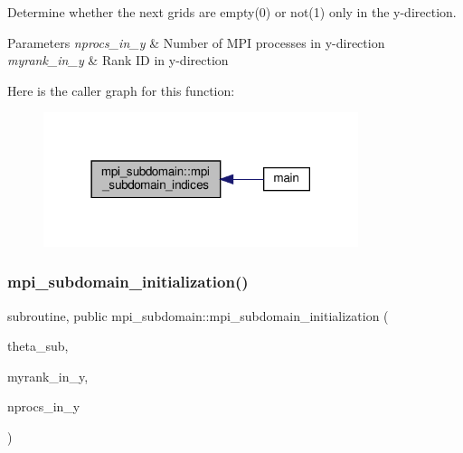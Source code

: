 Determine whether the next grids are empty(0) or not(1) only in the y-\/direction. 


\begin{DoxyParams}{Parameters}
{\em nprocs\+\_\+in\+\_\+y} & Number of M\+PI processes in y-\/direction \\
\hline
{\em myrank\+\_\+in\+\_\+y} & Rank ID in y-\/direction \\
\hline
\end{DoxyParams}
Here is the caller graph for this function\+:
\nopagebreak
\begin{figure}[H]
\begin{center}
\leavevmode
\includegraphics[width=261pt]{namespacempi__subdomain_afe948dc18da021f2448cf9a6265155fe_icgraph}
\end{center}
\end{figure}
\mbox{\label{namespacempi__subdomain_a7cc0deb85b84358eb7addeea849733c4}} 
\subsubsection{\texorpdfstring{mpi\+\_\+subdomain\+\_\+initialization()}{mpi\_subdomain\_initialization()}}
{\footnotesize\ttfamily subroutine, public mpi\+\_\+subdomain\+::mpi\+\_\+subdomain\+\_\+initialization (\begin{DoxyParamCaption}\item[{double precision, dimension(0\+:\hyperlink{namespacempi__subdomain_a005fe127fe0fc85b932814a820a36444}{nx\+\_\+sub}, 0\+:\hyperlink{namespacempi__subdomain_a665ba05d0ae9309dd28b9b513a0c87a1}{ny\+\_\+sub}, 0\+:\hyperlink{namespacempi__subdomain_a07555cc931ac78376a4c81207662251f}{nz\+\_\+sub}), intent(inout)}]{theta\+\_\+sub,  }\item[{integer, intent(in)}]{myrank\+\_\+in\+\_\+y,  }\item[{integer, intent(in)}]{nprocs\+\_\+in\+\_\+y }\end{DoxyParamCaption})}



